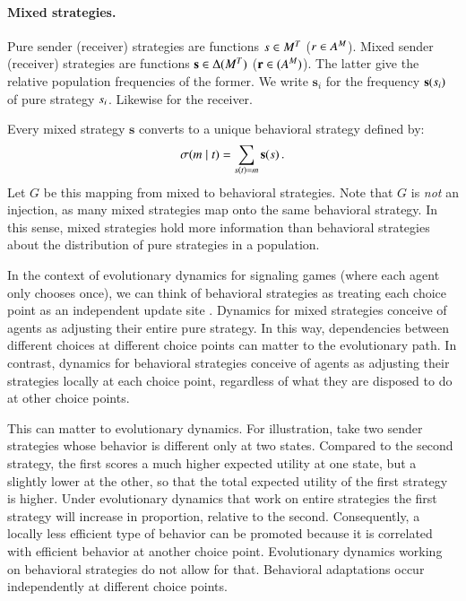 \documentclass[fleqn,reqno,10pt]{article}
\renewcommand{\Smixed}{\ensuremath{\mathrm{\mathbf{s}}}}
\renewcommand{\Rmixed}{\ensuremath{\mathrm{\mathbf{r}}}}
\begin{document}
\paragraph{Mixed strategies.} Pure sender (receiver) strategies are
functions $s \in M^T$ ($r \in
A^M$). Mixed sender (receiver) strategies are functions
$\Smixed \in \Delta(\Messgs^\States)$ ($\Rmixed \in
(\Acts^\Messgs)$). The latter give the relative population frequencies
of the former. We write $\Smixed_i$ for the frequency
$\Smixed(\Spure_i)$ of pure strategy $s_i$. Likewise for the
receiver.

Every mixed strategy $\Smixed$ converts to a unique behavioral
strategy defined by:
\begin{align}
  \label{eq:CorrespondenceBehavioralMixed}
  \Sstrat(\messg \probbar \state) = \sum_{\Spure(\state) = \messg} \Smixed(\Spure)\,.
\end{align}
Let $G$ be this mapping from mixed to behavioral strategies. Note that $G$
is \emph{not} an injection, as many mixed strategies map onto the same
behavioral strategy. In this sense, mixed strategies hold more
information than behavioral strategies about the distribution of pure strategies in a population.

In the context of evolutionary dynamics for signaling games (where
each agent only chooses once), we can think of behavioral strategies
as treating each choice point as an independent update site
\citep[e.g.][]{Cressman2003:Evolutionary-Dy}. Dynamics for mixed
strategies conceive of agents as adjusting their entire pure
strategy. In this way, dependencies between different choices at
different choice points can matter to the evolutionary path. In
contrast, dynamics for behavioral strategies conceive of agents as
adjusting their strategies locally at each choice point, regardless of
what they are disposed to do at other choice points.

This can matter to evolutionary dynamics. For illustration, take two
sender strategies whose behavior is different only at two
states. Compared to the second strategy, the first scores a much
higher expected utility at one state, but a slightly lower at the
other, so that the total expected utility of the first strategy is
higher. Under evolutionary dynamics that work on entire strategies the
first strategy will increase in proportion, relative to the
second. Consequently, a locally less efficient type of behavior can be
promoted because it is correlated with efficient behavior at another
choice point. Evolutionary dynamics working on behavioral strategies
do not allow for that. Behavioral adaptations occur independently at
different choice points.
\end{document}
